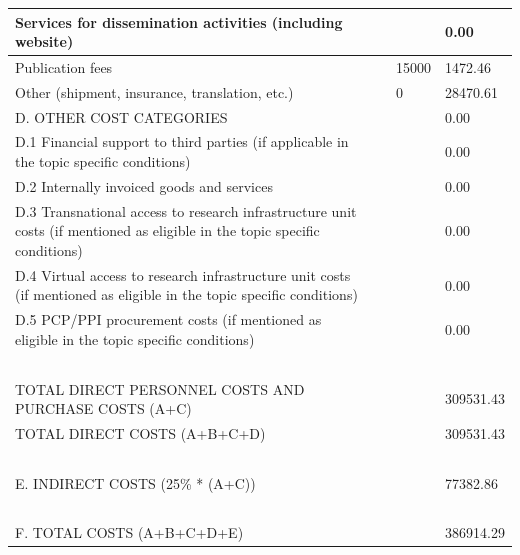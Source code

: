 \begin{table}[H]
\begin{tabular}{|l|l|l|l|}
Services for dissemination activities (including website) & ~ & ~ & 0.00 \\ \hline
Publication fees & ~ & 15000 & 1472.46 \\ \hline
Other (shipment, insurance, translation, etc.) & ~ & 0 & 28470.61 \\ \hline
D. OTHER COST CATEGORIES & ~ & ~ & 0.00\\ \hline
D.1 Financial support to third parties (if applicable in the topic specific conditions) & ~ & ~ & 0.00 \\ \hline
D.2 Internally invoiced goods and services & ~ & ~ & 0.00 \\ \hline
D.3 Transnational access to research infrastructure unit costs (if mentioned as eligible in the topic specific conditions) & ~ & ~ & 0.00 \\ \hline
D.4 Virtual access to research infrastructure unit costs (if mentioned as eligible in the topic specific conditions) & ~ & ~ & 0.00 \\ \hline
D.5 PCP/PPI procurement costs (if mentioned as eligible in the topic specific conditions) & ~ & ~ & 0.00 \\ \hline
~ & ~ & ~ & ~ \\ \hline
TOTAL DIRECT PERSONNEL COSTS AND PURCHASE COSTS (A+C) & ~ & ~ & 309531.43 \\ \hline
TOTAL DIRECT COSTS (A+B+C+D) & ~ & ~ & 309531.43 \\ \hline
~ & ~ & ~ & ~ \\ \hline
E. INDIRECT COSTS (25\% * (A+C)) & ~ & ~ & 77382.86 \\ \hline
~ & ~ & ~ & ~ \\ \hline
F. TOTAL COSTS (A+B+C+D+E) & ~ & ~ & 386914.29 \\ \hline
\end{tabular}
\end{table}

